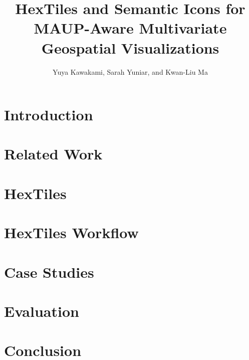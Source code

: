 \documentclass[preprint,journal]{vgtc}                     %
\title{HexTiles and Semantic Icons for \\ MAUP-Aware Multivariate Geospatial Visualizations}
\author{%
    Yuya Kawakami, Sarah Yuniar, and Kwan-Liu Ma
}
\begin{document}
\maketitle

\section{Introduction}\label{sec:intro}

\section{Related Work}\label{sec:relworks}

\section{HexTiles}\label{sec:methods}

\section{HexTiles Workflow}\label{sec:workflow}

\section{Case Studies}\label{sec:cases}

\section{Evaluation}\label{sec:feedback}

\section{Conclusion}\label{sec:conclusion}

%
%   
  
        

% 
\end{document}
